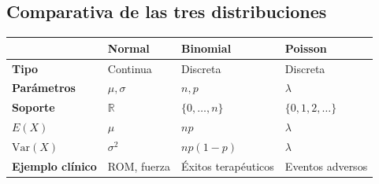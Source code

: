 \documentclass[
  letterpaper,
  DIV=11,
  numbers=noendperiod]{scrartcl}
\newcounter{none} %
\begin{document}
\subsection{Comparativa de las tres
distribuciones}\label{comparativa-de-las-tres-distribuciones}

{\def\LTcaptype{none} %
\begin{longtable}[]{@{}
  >{\raggedright\arraybackslash}p{}
  >{\raggedright\arraybackslash}p{}
  >{\raggedright\arraybackslash}p{}
  >{\raggedright\arraybackslash}p{}@{}}
\toprule\noalign{}
\begin{minipage}[b]{\linewidth}\raggedright
\end{minipage} & \begin{minipage}[b]{\linewidth}\raggedright
Normal
\end{minipage} & \begin{minipage}[b]{\linewidth}\raggedright
Binomial
\end{minipage} & \begin{minipage}[b]{\linewidth}\raggedright
Poisson
\end{minipage} \\
\midrule\noalign{}
\endhead
\bottomrule\noalign{}
\endlastfoot
\textbf{Tipo} & Continua & Discreta & Discreta \\
\textbf{Parámetros} & \(\mu, \sigma\) & \(n, p\) & \(\lambda\) \\
\textbf{Soporte} & \(\mathbb{R}\) & \(\{0,\ldots,n\}\) &
\(\{0,1,2,\ldots\}\) \\
\textbf{\(E(X)\)} & \(\mu\) & \(np\) & \(\lambda\) \\
\textbf{\(\text{Var}(X)\)} & \(\sigma^2\) & \(np(1-p)\) & \(\lambda\) \\
\textbf{Ejemplo clínico} & ROM, fuerza & Éxitos terapéuticos & Eventos
adversos \\
\end{longtable}
}
\end{document}
